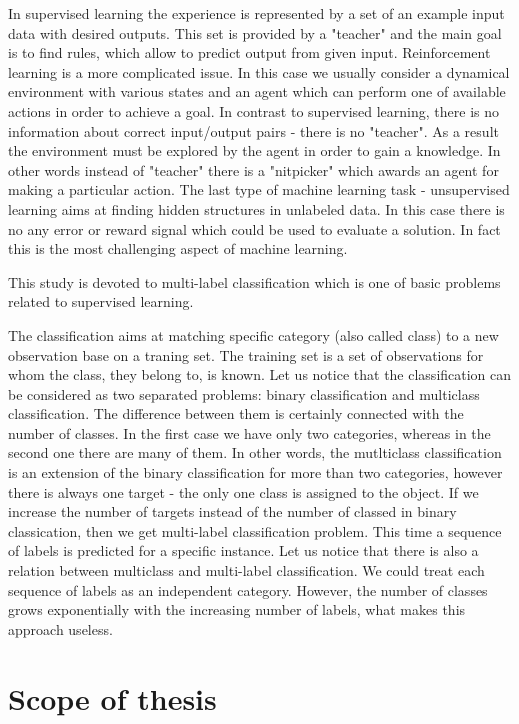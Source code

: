 In supervised learning the experience is represented by a set of an example input data with desired outputs. This set is provided by a "teacher" and the main goal is to find rules, which allow to predict output from given input. Reinforcement learning is a more complicated issue. In this case we usually consider a dynamical environment with various states and an agent which can perform one of available actions in order to achieve a goal. In contrast to supervised learning, there is no information about correct input/output pairs - there is no "teacher". As a result the environment must be explored by the agent in order to gain a knowledge. In other words instead of "teacher" there is a "nitpicker" which awards an agent for making a particular action. The last type of machine learning task - unsupervised learning aims at finding hidden structures in unlabeled data. In this case there is no any error or reward signal which could be used to evaluate a solution. In fact this is the most challenging aspect of machine learning. 

This study is devoted to multi-label classification which is one of basic problems related to supervised learning. 

The classification aims at matching specific category (also called class) to a new observation base on a traning set. The training set is a set of observations for whom the class, they belong to, is known. Let us notice that the classification can be considered as two separated problems: binary classification and multiclass classification. The difference between them is certainly connected with the number of classes. In the first case we have only two categories, whereas in the second one there are many of them. In other words, the mutlticlass classification is an extension of the binary classification for more than two categories, however there is always one target - the only one class is assigned to the object. If we increase the number of targets instead of the number of classed in binary classication, then we get multi-label classification problem. This time a sequence of labels is predicted for a specific instance. Let us notice that there is also a relation between multiclass and multi-label classification. We could treat each sequence of labels as an independent category. However, the number of classes grows exponentially with the increasing number of labels, what makes this approach useless. 

\section{Scope of thesis}

